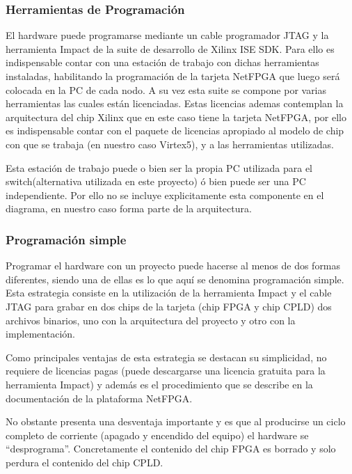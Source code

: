 \subsubsection{Herramientas de Programaci\'on}

El hardware puede programarse mediante un cable programador JTAG y la herramienta Impact de la suite de desarrollo de Xilinx ISE SDK. Para ello es indispensable contar con una estaci\'on de trabajo con dichas herramientas instaladas, habilitando la programaci\'on  de la tarjeta NetFPGA que luego ser\'a colocada en la PC de cada nodo. A su vez esta suite se compone por varias herramientas las cuales están licenciadas. Estas licencias ademas contemplan la arquitectura del chip Xilinx que en este caso tiene la tarjeta NetFPGA, por ello es indispensable contar con el paquete de licencias apropiado al modelo de chip con que se trabaja (en nuestro caso Virtex5), y a las herramientas utilizadas. 

Esta estaci\'on de trabajo puede o bien ser la propia PC utilizada para el switch(alternativa utilizada en este proyecto) \'o bien puede ser una PC independiente. Por ello no se incluye explicitamente esta componente en el diagrama, en nuestro caso forma parte de la arquitectura.


\subsubsection{Programaci\'on simple}
Programar el hardware con un proyecto puede hacerse al menos de dos formas diferentes, siendo una de ellas es lo que aqu\'i se denomina programaci\'on simple. Esta estrategia consiste en la utilizaci\'on de la herramienta Impact y el cable JTAG para grabar en dos chips de la tarjeta (chip FPGA y chip CPLD) dos archivos binarios, uno con la arquitectura del proyecto y otro con la implementaci\'on.

Como principales ventajas de esta estrategia se destacan su simplicidad, no requiere de licencias pagas (puede descargarse una licencia gratuita para la herramienta Impact) y adem\'as es el procedimiento que se describe en la documentaci\'on de la plataforma NetFPGA.

No obstante presenta una desventaja importante y es que al producirse un ciclo completo de corriente (apagado y encendido del equipo) el hardware se “desprograma”. Concretamente el contenido del chip FPGA es borrado y solo perdura el contenido del chip CPLD.\\

